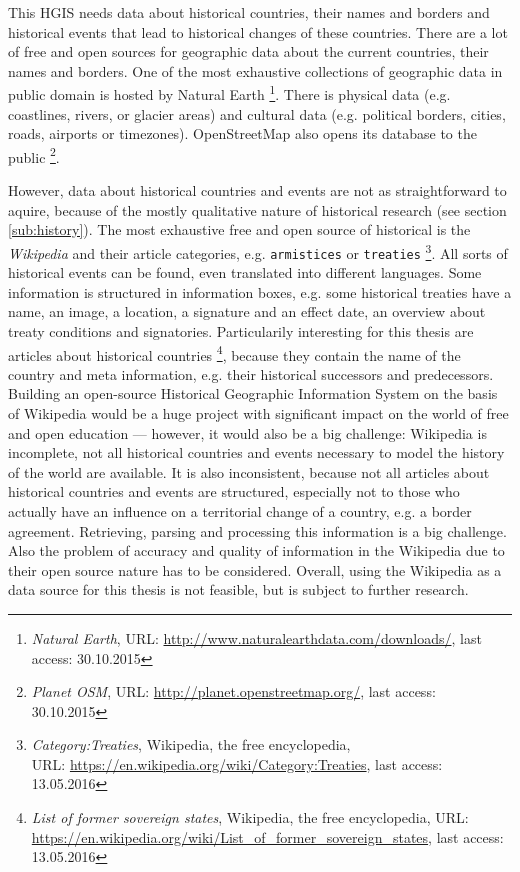 This HGIS needs data about historical countries, their names and borders and historical events that lead to historical changes of these countries. There are a lot of free and open sources for geographic data about the current countries, their names and borders. One of the most exhaustive collections of geographic data in public domain is hosted by Natural Earth
\footnote{
  \textit{Natural Earth},
  URL: \url{http://www.naturalearthdata.com/downloads/},
  last access: 30.10.2015
}.
There is physical data (e.g. coastlines, rivers, or glacier areas) and cultural data (e.g. political borders, cities, roads, airports or timezones). OpenStreetMap also opens its database to the public
\footnote{
  \textit{Planet OSM},
  URL: \url{http://planet.openstreetmap.org/},
  last access: 30.10.2015
}.

However, data about historical countries and events are not as straightforward to aquire, because of the mostly qualitative nature of historical research (see section \ref{sub:history}). The most exhaustive free and open source of historical is the \emph{Wikipedia} and their article categories, e.g. \texttt{armistices} or \texttt{treaties}
\footnote{
  \textit{Category:Treaties},
  Wikipedia, the free encyclopedia,\\
  URL: \url{https://en.wikipedia.org/wiki/Category:Treaties},
  last access: 13.05.2016
}.
All sorts of historical events can be found, even translated into different languages. Some information is structured in information boxes, e.g. some historical treaties have a name, an image, a location, a signature and an effect date, an overview about treaty conditions and signatories. Particularily interesting for this thesis are articles about historical countries
\footnote{
  \textit{List of former sovereign states},
  Wikipedia, the free encyclopedia,
  URL: \url{https://en.wikipedia.org/wiki/List_of_former_sovereign_states},
  last access: 13.05.2016
},
because they contain the name of the country and meta information, e.g. their historical successors and predecessors. Building an open-source Historical Geographic Information System on the basis of Wikipedia would be a huge project with significant impact on the world of free and open education --- however, it would also be a big challenge: Wikipedia is incomplete, not all historical countries and events necessary to model the history of the world are available. It is also inconsistent, because not all articles about historical countries and events are structured, especially not to those who actually have an influence on a territorial change of a country, e.g. a border agreement. Retrieving, parsing and processing this information is a big challenge. Also the problem of accuracy and quality of information in the Wikipedia due to their open source nature has to be considered. Overall, using the Wikipedia as a data source for this thesis is not feasible, but is subject to further research.

